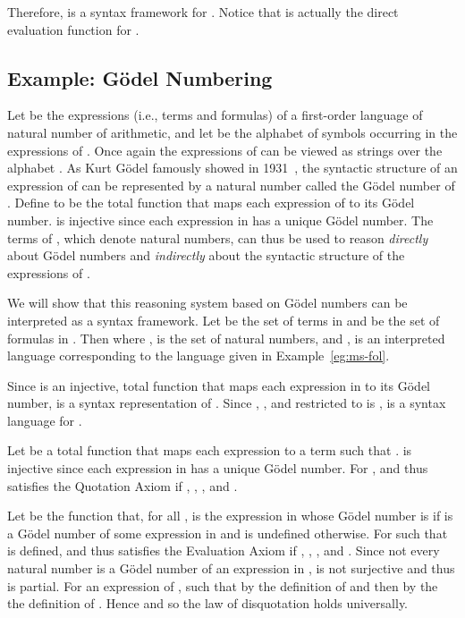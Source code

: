 \documentclass[11pt,fleqn]{article}
\begin{document}
Therefore,  is a syntax framework for
. Notice that  is actually the direct evaluation function
for .

\subsection{Example: G\"odel Numbering} \label{subsec:goedel}

Let  be the expressions (i.e., terms and formulas) of a first-order
language of natural number of arithmetic, and let  be the
alphabet of symbols occurring in the expressions of .  Once again
the expressions of  can be viewed as strings over the alphabet
.  As Kurt G\"odel famously showed in 1931~\cite{Goedel31}, the
syntactic structure of an expression  of  can be represented by
a natural number called the G\"odel number of .  Define  to be
the total function that maps each expression of  to its G\"odel
number.   is injective since each expression in  has a unique
G\"odel number.  The terms of , which denote natural numbers, can
thus be used to reason \emph{directly} about G\"odel numbers and
\emph{indirectly} about the syntactic structure of the expressions of
.

We will show that this reasoning system based on G\"odel numbers can
be interpreted as a syntax framework.  Let  be the set of
terms in  and  be the set of formulas in .  Then  where ,  is the set of natural numbers, and , is an interpreted language corresponding to
the language given in Example~\ref{eg:ms-fol}.

Since  is an injective, total function that
maps each expression in  to its G\"odel number,  is a syntax representation of .  Since , , and  restricted to  is ,  is a syntax language
for .

Let  be a total function that maps each
expression  to a term  such that .   is injective since each expression in  has a
unique G\"odel number.  For ,  and thus  satisfies the Quotation Axiom if , , , and .

Let  be the function that, for all ,  is the expression in  whose G\"odel number is
 if  is a G\"odel number of some
expression in  and  is undefined otherwise. For  such that  is defined,  and thus  satisfies the Evaluation Axiom if
, , , and
.  Since not every natural number is a
G\"odel number of an expression in ,  is
not surjective and thus  is partial.  For an
expression  of ,  such that  by
the definition of  and then  by the the definition of
.  Hence  and so the law of disquotation holds
universally.
\end{document}

